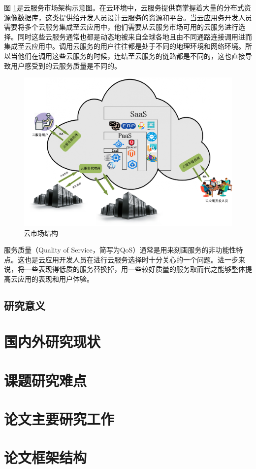 		图 \ref{fig_The_cloud_architecture}是云服务市场架构示意图。在云环境中，云服务提供商掌握着大量的分布式资源像数据库，这类提供给开发人员设计云服务的资源和平台。当云应用务开发人员需要将多个云服务集成至云应用中，他们需要从云服务市场可用的云服务进行选择。同时这些云服务通常也都是动态地被来自全球各地且由不同通路连接调用进而集成至云应用中。调用云服务的用户往往都是处于不同的地理环境和网络环境。所以当他们在调用这些云服务的时候，连结至云服务的链路都是不同的，这也直接导致用户感受到的云服务质量是不同的。
		\begin{figure}[htb]
			\centering
			\includegraphics[scale=0.5]{fig/introduction/The_cloud_architecture.png}
			\caption{云市场结构}
			\label{fig_The_cloud_architecture}
			\centering{}
		\end{figure}
		
		服务质量（Quality of Service，简写为QoS）通常是用来刻画服务的非功能性特点。这也是云应用开发人员在进行云服务选择时十分关心的一个问题。进一步来说，将一些表现得低质的服务替换掉，用一些较好质量的服务取而代之能够整体提高云应用的表现和用户体验。     
		\subsection{研究意义}
		\label{subsec_meaning}
	\section{国内外研究现状}
	\label{sec_current_situation}
	\section{课题研究难点}
	\label{sec_main_points}
	\section{论文主要研究工作}
	\label{sec_main_works}
	\section{论文框架结构}
	\label{sec_paper_architecture}
